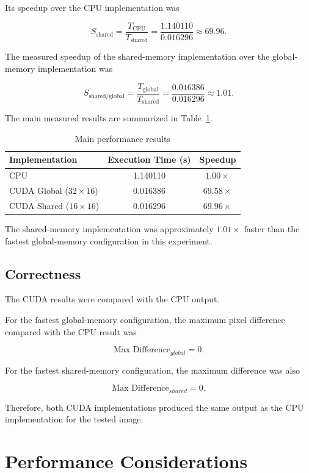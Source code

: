 \documentclass[11pt]{article}
\begin{document}
Its speedup over the CPU implementation was

\[
S_{\mathrm{shared}}
=
\frac{T_{\mathrm{CPU}}}{T_{\mathrm{shared}}}
=
\frac{1.140110}{0.016296}
\approx 69.96.
\]

The measured speedup of the shared-memory implementation over the
global-memory implementation was

\[
S_{\mathrm{shared/global}}
=
\frac{T_{\mathrm{global}}}{T_{\mathrm{shared}}}
=
\frac{0.016386}{0.016296}
\approx 1.01.
\]

The main measured results are summarized in Table~\ref{tab:summary}.

\begin{table}[H]
\centering
\caption{Main performance results}
\label{tab:summary}
\begin{tabular}{lcc}
\toprule
Implementation & Execution Time (s) & Speedup \\
\midrule
CPU & 1.140110 & $1.00\times$ \\
CUDA Global ($32\times16$) & 0.016386 & $69.58\times$ \\
CUDA Shared ($16\times16$) & 0.016296 & $69.96\times$ \\
\bottomrule
\end{tabular}
\end{table}

The shared-memory implementation was approximately $1.01\times$ faster
than the fastest global-memory configuration in this experiment.

\subsection{Correctness}

The CUDA results were compared with the CPU output.

For the fastest global-memory configuration, the maximum pixel
difference compared with the CPU result was

\[
\text{Max Difference}_{global}=0.
\]

For the fastest shared-memory configuration, the maximum difference
was also

\[
\text{Max Difference}_{shared}=0.
\]

Therefore, both CUDA implementations produced the same output as the
CPU implementation for the tested image.

\section{Performance Considerations}
\end{document}
